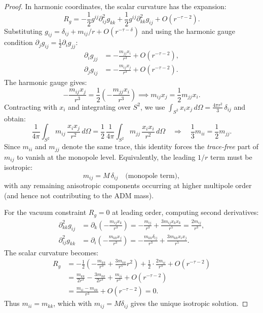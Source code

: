 \begin{proof}
In harmonic coordinates, the scalar curvature has the expansion:
\begin{equation}
    R_g = -\frac{1}{2} g^{ij} \partial^2_{ij} g_{kk} + \frac{1}{2} g^{ij} \partial^2_{kk} g_{ij} + O(r^{-\tau-2}).
\end{equation}
Substituting $g_{ij} = \delta_{ij} + m_{ij}/r + O(r^{-\tau-\delta})$ and using the harmonic gauge condition $\partial_j g_{ij} = \frac{1}{2} \partial_i g_{jj}$:
\begin{align}
    \partial_i g_{jj} &= -\frac{m_{jj} x_i}{r^3} + O(r^{-\tau-2}), \\
    \partial_j g_{ij} &= -\frac{m_{ij} x_j}{r^3} + O(r^{-\tau-2}).
\end{align}
The harmonic gauge gives:
\begin{equation}
    -\frac{m_{ij} x_j}{r^3} = \frac{1}{2} \left( -\frac{m_{jj} x_i}{r^3} \right) \implies m_{ij} x_j = \frac{1}{2} m_{jj} x_i.
\end{equation}
Contracting with $x_i$ and integrating over $S^2$, we use
\(\int_{S^2} x_i x_j\, d\Omega = \frac{4\pi r^2}{3}\,\delta_{ij}\) and obtain:
\begin{equation}
    \frac{1}{4\pi}\int_{S^2} m_{ij}\,\frac{x_i x_j}{r^2}\,d\Omega
    = \frac{1}{2}\,\frac{1}{4\pi}\int_{S^2} m_{jj}\,\frac{x_i x_i}{r^2}\,d\Omega
    \quad\Longrightarrow\quad
    \frac{1}{3}m_{ii}=\frac{1}{2}m_{jj}.
\end{equation}
Since $m_{ii}$ and $m_{jj}$ denote the same trace, this identity forces the \emph{trace-free} part of $m_{ij}$ to vanish at the monopole level. Equivalently, the leading $1/r$ term must be isotropic:
\begin{equation}
    m_{ij} = M\,\delta_{ij} \quad\text{(monopole term)},
\end{equation}
with any remaining anisotropic components occurring at higher multipole order (and hence not contributing to the ADM mass).

For the vacuum constraint $R_g = 0$ at leading order, computing second derivatives:
\begin{align}
    \partial^2_{kk} g_{ij} &= \partial_k \left( -\frac{m_{ij} x_k}{r^3} \right) = -\frac{m_{ij}}{r^3} + \frac{3 m_{ij} x_k x_k}{r^5} = \frac{2 m_{ij}}{r^3}, \\
    \partial^2_{ij} g_{kk} &= \partial_i \left( -\frac{m_{kk} x_j}{r^3} \right) = -\frac{m_{kk} \delta_{ij}}{r^3} + \frac{3 m_{kk} x_i x_j}{r^5}.
\end{align}
The scalar curvature becomes:
\begin{align}
    R_g &= -\frac{1}{2} \left( -\frac{m_{kk}}{r^3} + \frac{3 m_{kk}}{r^5} r^2 \right) + \frac{1}{2} \cdot \frac{2 m_{ii}}{r^3} + O(r^{-\tau-2}) \\
    &= \frac{m_{kk}}{2r^3} - \frac{3 m_{kk}}{2r^3} + \frac{m_{ii}}{r^3} + O(r^{-\tau-2}) \\
    &= \frac{m_{ii} - m_{kk}}{r^3} + O(r^{-\tau-2}) = 0.
\end{align}
Thus $m_{ii} = m_{kk}$, which with $m_{ij} = M\delta_{ij}$ gives the unique isotropic solution.


\end{proof}
